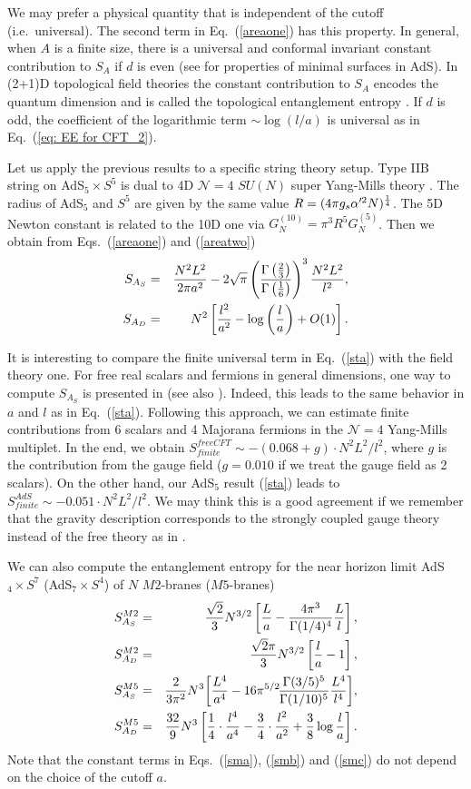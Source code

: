 \documentclass[twocolumn,amsmath,amssymb,nofootinbib,eqsecnum,tighten,prd]{revtex4}
\def\frac#1#2{{#1\over #2}}
\def\s{\sqrt}
\def\al{\alpha'}
\def\f {\frac}
\def\frac#1#2{{#1\over #2}}
\def\s{\sqrt}
\def\ba{\begin{eqnarray}}
\def\ea{\end{eqnarray}}
\begin{document}
We may prefer a physical quantity that is independent of the cutoff
(i.e.~universal). The second term in Eq.\ (\ref{areaone}) has this
property. In general, when $A$ is a finite size, there is a
universal and conformal invariant constant contribution to $S_A$ if
$d$ is even (see \cite{GrWi} for properties of minimal surfaces in
AdS). In (2+1)D topological field theories the constant contribution
to $S_A$ encodes the quantum dimension and is called the topological
entanglement entropy \cite{Kitaev05, Levin05}.  If $d$ is odd, the
coefficient of the logarithmic term $\sim \log(l/a)$ is universal as
in Eq.\ (\ref{eq: EE for CFT_2}).



Let us apply the previous results to a specific string theory setup.
Type IIB string on AdS$_5\times S^5$ is dual to 4D $\mathcal{N}=4$
$SU(N)$ super Yang-Mills theory \cite{Maldacena}. 
The radius of AdS$_5$ and $S^5$ are
given by the same value $R=(4\pi g_s \al^2 N)^{\f{1}{4}}$. The 5D Newton constant
is related to the 10D one via $G^{(10)}_N=\pi^3R^5 G^{(5)}_N $. Then
we obtain from Eqs.\ (\ref{areaone}) and (\ref{areatwo}) \ba
S_{A_{S}}&=&\f{N^2L^2}{2\pi a^2}-2\s{\pi}
\left(\f{\Gamma\left(\f23\right)}{\Gamma\left(\f16\right)}
\right)^3\f{N^2L^2}{l^2}, \label{sta}\\
S_{A_{D}}&=&
N^2\left[\f{l^2}{a^2}-\log\left(\f{l}{a}\right)+O(1)\right].
\ea


It is interesting to compare the finite universal term in Eq.\
(\ref{sta}) with the field theory one. For free real scalars and
 fermions in general dimensions, one way to compute $S_{A_S}$
is presented in \cite{Casini} (see also \cite{Fursaev}). Indeed, this leads to the same
behavior in $a$ and $l$ as in Eq.\ (\ref{sta}). Following this
approach, we can estimate finite contributions from 6 scalars and 4
Majorana fermions in the $\mathcal{N}=4$ Yang-Mills multiplet.  In
the end, we obtain $S^{freeCFT}_{finite}\sim -(0.068+g)\cdot
N^2L^2/l^2$, where $g$ is the contribution from the gauge field
($g=0.010$ if we treat the gauge field as 2 scalars). On the other
hand, our AdS$_5$ result (\ref{sta}) leads to $S^{AdS}_{finite}\sim
-0.051\cdot N^2L^2/l^2$. We may think this is a good agreement if we
remember that the gravity description corresponds to the strongly
coupled gauge theory
 instead of the free theory as in \cite{GKP}.


We can also compute the entanglement entropy for the near horizon limit
AdS$_{4}\times S^{7}$ (AdS$_{7}\times S^{4}$) of $N$ $M2$-branes
($M5$-branes)
\ba
S^{M2}_{A_S}&=&\f{\s{2}}{3}N^{3/2}\left[\f{L}{a}-
\f{4\pi^3}{\Gamma(1/4)^4}\f{L}{l}\right], \label{sma} \\
S^{M2}_{A_D}&=&\f{\s{2}\pi}{3}N^{3/2}\left[\f{l}{a}-1\right],  \label{smb}\\
 S^{M5}_{A_S}&=&\!\f{2}{3\pi^2}N^{3}\!\left[\f{L^4}{a^4}-
16\pi^{5/2}\!\f{\Gamma(3/5)^5}{\Gamma(1/10)^5}\f{L^4}{l^4}\right]\!,  \label{smc}\\
S^{M5}_{A_D}&=&\f{32}{9}N^{3}\left[\f{1}{4}\cdot\f{l^4}{a^4}
-\f{3}{4}\cdot\f{l^2}{a^2}+\f{3}{8}\log\f{l}{a}\right]. \ea Note
that the constant terms in Eqs.\ (\ref{sma}), (\ref{smb}) and  (\ref{smc})
do not depend on the choice of the cutoff $a$.
\end{document}
